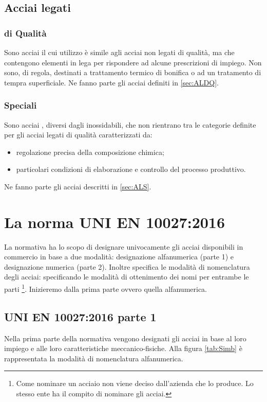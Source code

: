 \subsection{Acciai legati}
\begin{multicols}{2}[]
\subsubsection{di Qualità}
Sono acciai il cui utilizzo è simile agli acciai non legati di qualità, ma che contengono elementi in lega per rispondere ad alcune prescrizioni di impiego.
Non sono, di regola, destinati a trattamento termico di bonifica o ad un tratamento di tempra superficiale.
Ne fanno parte gli acciai definiti in \ref{sec:ALDQ}.
\columnbreak
\subsubsection{Speciali}
Sono acciai , diversi dagli inossidabili, che non rientrano tra le categorie definite per gli acciai legati di qualità caratterizzati da:
\begin{itemize}
\item regolazione precisa della composizione chimica;
\item particolari condizioni di elaborazione e controllo del processo produttivo.
\end{itemize}
Ne fanno parte gli acciai descritti in \ref{sec:ALS}.
\end{multicols}

\section{La norma UNI EN 10027:2016}
La normativa ha lo scopo di designare univocamente gli acciai disponibili in commercio in base a due modalità: designazione alfanumerica (parte 1) e designazione numerica (parte 2).
Inoltre specifica le modalità di nomenclatura degli acciai: specificando le modalità di ottenimento dei nomi per entrambe le parti%
\footnote{Come nominare un acciaio non viene deciso dall'azienda che lo produce. Lo stesso ente ha il compito di nominare gli acciai.}.
Inizieremo dalla prima parte ovvero quella alfanumerica.
\subsection{UNI EN 10027:2016 parte 1}
Nella prima parte della normativa vengono designati gli acciai in base al loro impiego e alle loro caratteristiche meccanico-fisiche.
Alla figura \ref{tab:Simb} è rappresentata la modalità di nomenclatura alfanumerica.

